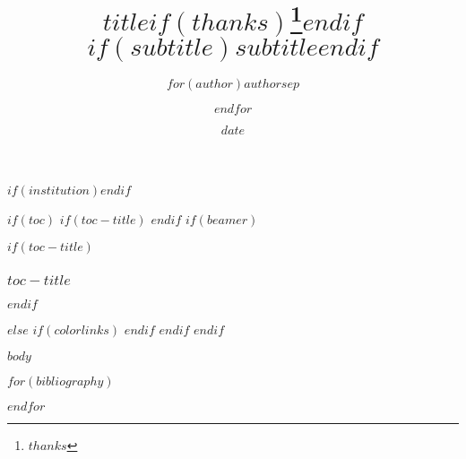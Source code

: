\documentclass{article}
\title{$title$$if(thanks)$\thanks{$thanks$}$endif$\\
$if(subtitle)$\Large \emph{$subtitle$}$endif$}
\author{$for(author)$$author$$sep$ \and $endfor$}
\date{$date$}
\begin{document}
\maketitle
$if(institution)$\thispagestyle{firstpage}$endif$

$if(toc)$
$if(toc-title)$
\renewcommand*\contentsname{$toc-title$}
$endif$
$if(beamer)$
\begin{frame}[allowframebreaks]
    $if(toc-title)$
    \frametitle{$toc-title$}
    $endif$
    \tableofcontents[hideallsubsections]
\end{frame}
$else$
{
    $if(colorlinks)$
    \hypersetup{linkcolor=$if(toccolor)$$toccolor$$else$$endif$}
    $endif$
    \setcounter{tocdepth}{$toc-depth$}
    \tableofcontents
}
$endif$
$endif$

$body$


$for(bibliography)$

$endfor$ 
\end{document}
